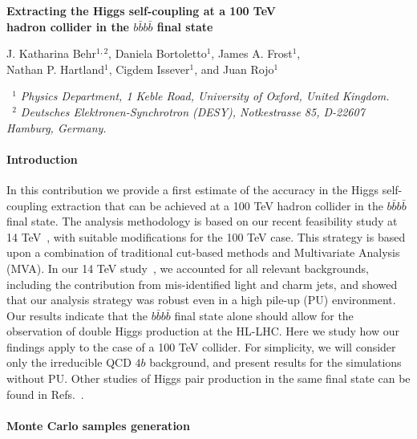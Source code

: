 \documentclass[a4paper,10pt]{article}
\begin{document}
\begin{center}
  {\Large \bf Extracting the Higgs self-coupling at a 100 TeV\\[0.2cm] hadron
  collider in the $b\bar{b}b\bar{b}$ final state}
\vspace{.7cm}

J. Katharina Behr$^{1,2}$, Daniela Bortoletto$^1$, James A. Frost$^1$,\\[0.1cm]
  Nathan P. Hartland$^1$, Cigdem Issever$^1$, and Juan Rojo$^1$


\vspace{.3cm}
       {\it ~$^1$ Physics Department, 1 Keble Road, University of Oxford, United Kingdom. \\[0.1cm]
       ~$^2$ Deutsches Elektronen-Synchrotron (DESY),
Notkestrasse 85, D-22607 Hamburg,
Germany.}

\end{center}
\vspace{0.2cm}


\paragraph{Introduction}

In this contribution we provide a first estimate of the accuracy
in the Higgs self-coupling extraction that can be achieved at a 100 TeV
hadron collider in the  $b\bar{b}b\bar{b}$ final state.
%
The analysis methodology is based on our recent feasibility
study at 14 TeV~\cite{Behr:2015oqq}, with suitable modifications for the 100 TeV
case.
%
This strategy is based upon a combination of traditional cut-based
 methods and Multivariate Analysis (MVA).
 In our 14 TeV study~\cite{Behr:2015oqq},  we accounted for  all relevant
  backgrounds, including the contribution from mis-identified
  light and charm jets, and showed that our
  analysis strategy was robust even in a high pile-up (PU)
  environment.
 Our results indicate that 
  the $b\bar{b}b\bar{b}$ 
final state
alone should allow for the observation of double Higgs production
at the HL-LHC.
%
Here we study how our findings apply to the case of a 100
TeV collider.
%
For simplicity, we will consider only the irreducible
QCD $4b$ background, and present results for the simulations without PU.
  Other studies of Higgs pair production in the same
final state can be found in Refs.~\cite{Wardrope:2014kya,deLima:2014dta}.

\paragraph{Monte Carlo samples generation}
\end{document}
